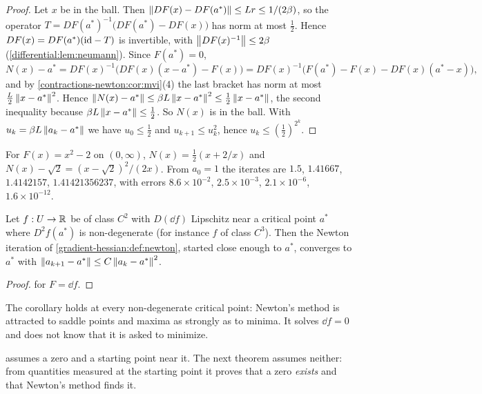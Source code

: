 \begin{notechapter}
\begin{proof}
Let $x$ be in the ball. Then
$\left\|DF(x) - DF(a^*)\right\|\leq Lr\leq1/(2\beta)$, so the operator
$T = DF(a^*)^{-1}\bigl(DF(a^*) - DF(x)\bigr)$ has norm at most $\frac12$.
Hence $DF(x) = DF(a^*)(\mathrm{id} - T)$ is invertible, with
$\left\|DF(x)^{-1}\right\|\leq2\beta$ (\cref{differential:lem:neumann}). Since
$F(a^*) = 0$,
\[
  N(x) - a^* = DF(x)^{-1}\bigl(DF(x)(x - a^*) - F(x)\bigr)
  = DF(x)^{-1}\bigl(F(a^*) - F(x) - DF(x)(a^* - x)\bigr) ,
\]
and by \cref{contractions-newton:cor:mvi}(4) the last bracket has norm at
most $\frac L2\left\|x - a^*\right\|^2$. Hence
$\left\|N(x) - a^*\right\|\leq\beta L\left\|x - a^*\right\|^2
\leq\frac12\left\|x - a^*\right\|$, the second inequality because
$\beta L\left\|x - a^*\right\|\leq\frac12$. So $N(x)$ is in the ball. With
$u_k = \beta L\left\|a_k - a^*\right\|$ we have $u_0\leq\frac12$ and
$u_{k+1}\leq u_k^2$, hence $u_k\leq(\frac12)^{2^k}$.
\end{proof}

\begin{example}\label{contractions-newton:ex:sqrt}
For $F(x) = x^2 - 2$ on $(0, \infty)$, $N(x) = \frac12(x + 2/x)$ and
$N(x) - \sqrt2 = (x - \sqrt2)^2/(2x)$. From $a_0 = 1$ the iterates are
$1.5$, $1.41667$, $1.4142157$, $1.41421356237$, with errors
$8.6\times10^{-2}$, $2.5\times10^{-3}$, $2.1\times10^{-6}$,
$1.6\times10^{-12}$.
\end{example}

\begin{corollary}
\label{contractions-newton:cor:min}
Let $f:U\to\mathbb{R}$ be of class $C^2$ with $D(\dd f)$ Lipschitz near a
critical point $a^*$ where $D^2f(a^*)$ is non-degenerate (for instance
$f$ of class $C^3$). Then the Newton iteration of
\cref{gradient-hessian:def:newton}, started close enough to $a^*$,
converges to $a^*$ with
$\left\|a_{k+1} - a^*\right\|\leq C\left\|a_k - a^*\right\|^2$.
\end{corollary}

\begin{proof}
 for $F = \dd f$.
\end{proof}

The corollary holds at every non-degenerate critical point: Newton's
method is attracted to saddle points and maxima as strongly as to minima.
It solves $\dd f = 0$ and does not know that it is asked to minimize.

 assumes a zero and a starting
point near it. The next theorem assumes neither: from quantities measured
at the starting point it proves that a zero \emph{exists} and that
Newton's method finds it.


\end{notechapter}
